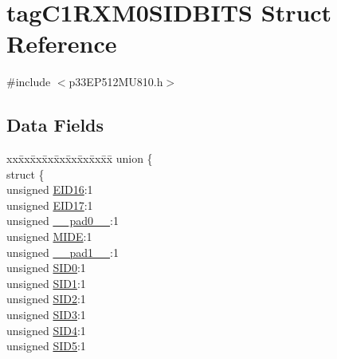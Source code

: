\hypertarget{structtag_c1_r_x_m0_s_i_d_b_i_t_s}{}\section{tag\+C1\+R\+X\+M0\+S\+I\+D\+B\+I\+TS Struct Reference}
\label{structtag_c1_r_x_m0_s_i_d_b_i_t_s}


{\ttfamily \#include $<$p33\+E\+P512\+M\+U810.\+h$>$}

\subsection*{Data Fields}
\begin{DoxyCompactItemize}
\item 
\begin{tabbing}
xx\=xx\=xx\=xx\=xx\=xx\=xx\=xx\=xx\=\kill
union \{\\
\>struct \{\\
\>\>unsigned \hyperlink{structtag_c1_r_x_m0_s_i_d_b_i_t_s_a6dd5663b0c9838c56db040560ca0efa1}{EID16}:1\\
\>\>unsigned \hyperlink{structtag_c1_r_x_m0_s_i_d_b_i_t_s_aa648615464b0eb29967529333eee9fd9}{EID17}:1\\
\>\>unsigned \hyperlink{structtag_c1_r_x_m0_s_i_d_b_i_t_s_adf71f3d8410c1f1dbbc96680a92c49af}{\_\_pad0\_\_}:1\\
\>\>unsigned \hyperlink{structtag_c1_r_x_m0_s_i_d_b_i_t_s_a3febd6bba68dc9477425e6ef6020e88a}{MIDE}:1\\
\>\>unsigned \hyperlink{structtag_c1_r_x_m0_s_i_d_b_i_t_s_acaf2d0924a107ec6e8d2e31febaf66f9}{\_\_pad1\_\_}:1\\
\>\>unsigned \hyperlink{structtag_c1_r_x_m0_s_i_d_b_i_t_s_a1ca276ac15df60e1f7b9a6d0011ade93}{SID0}:1\\
\>\>unsigned \hyperlink{structtag_c1_r_x_m0_s_i_d_b_i_t_s_a3405d354f81391f879648f69f504dfc8}{SID1}:1\\
\>\>unsigned \hyperlink{structtag_c1_r_x_m0_s_i_d_b_i_t_s_ad744966dfc49307f731b7045b01b94e5}{SID2}:1\\
\>\>unsigned \hyperlink{structtag_c1_r_x_m0_s_i_d_b_i_t_s_a9345f3e64720be93e83d8dfc827f3f45}{SID3}:1\\
\>\>unsigned \hyperlink{structtag_c1_r_x_m0_s_i_d_b_i_t_s_aefb106fed4bb40e2c3c71ac612c554e3}{SID4}:1\\
\>\>unsigned \hyperlink{structtag_c1_r_x_m0_s_i_d_b_i_t_s_a0f221b3c9612231686bf87ccdcec8489}{SID5}:1\\

\end{tabbing}
\end{DoxyCompactItemize}
